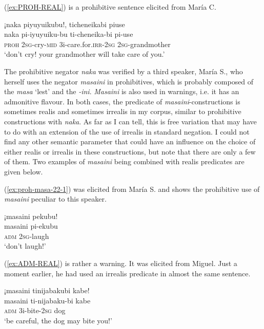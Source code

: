 (\ref{ex:PROH-REAL}) is a prohibitive sentence elicited from María C.

\ea\label{ex:PROH-REAL}
\begingl 
\glpreamble ¡naka piyuyuikubu!, ticheneikabi piuse\\
\gla naka pi-iyuyuiku-bu ti-cheneika-bi pi-use\\ 
\glb \textsc{proh} 2\textsc{sg}-cry-\textsc{mid} 3i-care.for.\textsc{irr}-2\textsc{sg} 2\textsc{sg}-grandmother\\ 
\glft ‘don’t cry! your grandmother will take care of you.’
 \trailingcitation{[uxx-c151002lf]}
\xe

The prohibitive negator \textit{naka} was verified by a third speaker, María S., who herself uses the negator \textit{masaini} in prohibitives, which is probably composed of the   \textit{masa} ‘lest’ and the  \textit{-ini}. \textit{Masaini} is also used in warnings, i.e. it has an admonitive  flavour. In both cases, the predicate of \mbox{\textit{masaini}-}constructions is sometimes realis and sometimes irrealis in my corpus, similar to prohibitive constructions with \textit{naka}. As far as I can tell, this is free variation that may have to do with an extension of the use of irrealis in standard negation. I could not find any other semantic parameter that could have an influence on the choice of either realis or irrealis in these constructions, but note that there are only a few of them. Two examples of \textit{masaini} being combined with realis predicates are given below.

(\ref{ex:proh-masa-22-1}) was elicited from María S. and shows the prohibitive use of \textit{masaini} peculiar to this speaker.

\ea\label{ex:proh-masa-22-1}
\begingl
\glpreamble ¡masaini pekubu!\\
\gla masaini pi-ekubu\\
\glb \textsc{adm} 2\textsc{sg}-laugh\\
\glft ‘don’t laugh!’
\endgl
 \trailingcitation{[rxx-e150220s-1.06]}
\xe

(\ref{ex:ADM-REAL}) is rather a warning. It was elicited from Miguel. Just a moment earlier, he had used an irrealis predicate in almost the same sentence.

\ea\label{ex:ADM-REAL}
\begingl 
\glpreamble ¡masaini tinijabakubi kabe!\\
\gla masaini ti-nijabaku-bi kabe\\ 
\glb \textsc{adm} 3i-bite-2\textsc{sg} dog\\ 
\glft ‘be careful, the dog may bite you!’
 \trailingcitation{[mrx-e150219s.149]}
\xe{} 

